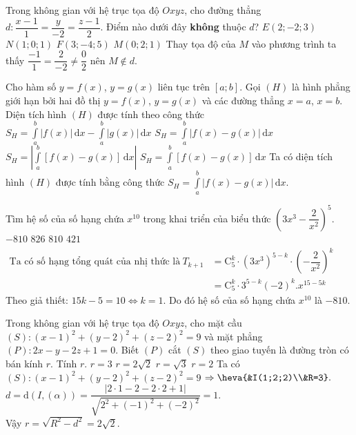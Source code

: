 \begin{ex}%
	Trong không gian với hệ trục tọa độ $Oxyz$, cho đường thẳng $d \colon  \dfrac{x-1}{1}=\dfrac{y}{-2}=\dfrac{z-1}{2}$. Điểm nào dưới đây \textbf{không} thuộc $d$? 
	\choice
	{$E(2;-2;3)$}
	{$N(1;0;1)$}
	{$F(3;-4;5)$}
	{\True $M(0;2;1)$}
	\loigiai
	{Thay tọa độ của $M$ vào phương trình ta thấy $\dfrac{-1}{1}=\dfrac{2}{-2}\neq \dfrac{0}{2}$ nên $M\notin d$.}
\end{ex}
\begin{ex}%
	Cho hàm số $y=f(x)$, $y=g(x)$ liên tục trên $[a;b]$. Gọi $(H)$ là hình phẳng giới hạn bởi hai đồ thị $y=f(x)$, $y=g(x)$ và các đường thẳng $x=a$, $x=b$. Diện tích hình $(H)$ được tính theo công thức
	\choice
	{$S_{H}=\displaystyle\int\limits_a^b  \left|f(x)\right|\mathrm{\, d}x-\displaystyle\int\limits_a^b  \left|g(x)\right|\mathrm{\, d}x$}
	{\True $S_{H}=\displaystyle\int\limits_a^b  \left|f(x)-g(x)\right|\mathrm{\, d}x$}
	{$S_{H}=\left|\displaystyle\int\limits_a^b  \left[f(x)-g(x)\right]\mathrm{\, d}x\right|$}
	{$S_{H}=\displaystyle\int\limits_a^b  \left[f(x)-g(x)\right]\mathrm{\, d}x$}
	\loigiai
	{Ta có diện tích hình $(H)$ được tính bằng công thức $S_{H}=\displaystyle\int\limits_a^b  \left|f(x)-g(x)\right|\mathrm{\, d}x$. }
\end{ex}
\begin{ex}%
	Tìm hệ số của số hạng chứa $x^{10}$ trong khai triển của biểu thức $\left(3x^3-\dfrac{2}{x^2}\right)^5$.
	\choice
	{\True $-810$}
	{$826$}
	{$810$}
	{$421$}
	\loigiai
	{$\begin{aligned} \text{Ta có số hạng tổng quát của nhị thức là}\ 
		T_{k+1}&=\mathrm{C}_{5}^k\cdot(3x^3)^{5-k}\cdot\left(-\dfrac{2}{x^2}
		\right)^{k}\\
		& =\mathrm{C}_{5}^k\cdot3^{5-k}(-2)^{k}.x^{15-5k}
		\end{aligned}$\\
		Theo giả thiết: $15k-5=10\Leftrightarrow k=1$.
		Do đó hệ số của số hạng chứa $x^{10}$ là $-810$.}
\end{ex}
\begin{ex}%
	Trong không gian với hệ trục tọa độ $Oxyz$, cho mặt cầu $(S) \colon (x-1)^2+(y-2)^2+(z-2)^2=9$ và mặt phẳng $(P) \colon 2x-y-2z+1=0$. Biết $(P)$ cắt $(S)$ theo giao tuyến là đường tròn có bán kính $r$. Tính $r$.
	\choice
	{$r=3$}
	{\True $r=2\sqrt{2}$}
	{$r=\sqrt{3}$}
	{$r=2$}
	\loigiai
	{Ta có $(S) \colon (x-1)^2+(y-2)^2+(z-2)^2=9$ $\Rightarrow \heva{&I(1;2;2)\\&R=3}.$\\ $d=\mathrm{d}\left(I,(\alpha)\right)=\dfrac{|2\cdot1-2-2\cdot2+1|}{\sqrt{2^2+(-1)^2+(-2)^2}}=1.$\\
		Vậy	$r=\sqrt{R^2-d^2}=2\sqrt{2}$.}
\end{ex}
